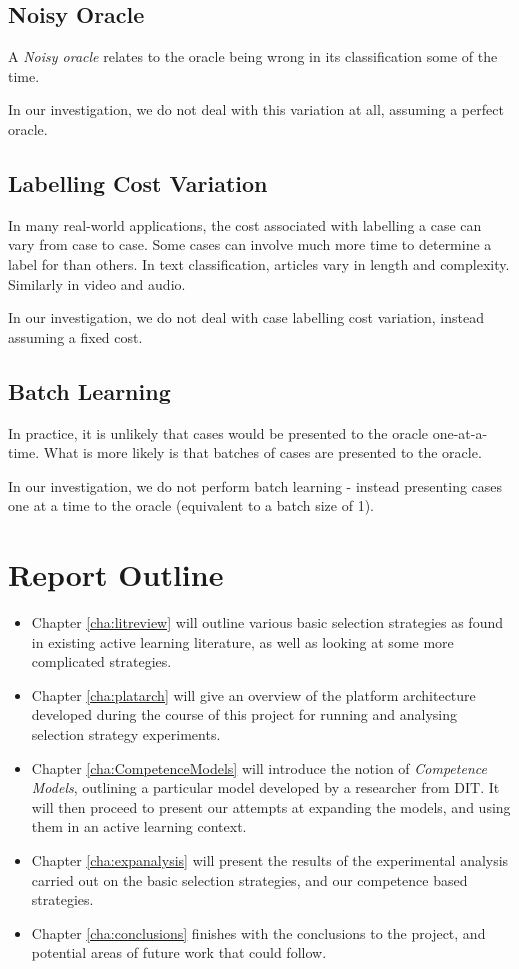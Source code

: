 \documentclass[a4paper,11pt]{report}
\begin{document}
\subsection{Noisy Oracle}
A \emph{Noisy oracle} relates to the oracle being wrong in its classification some of the time.

In our investigation, we do not deal with this variation at all, assuming a perfect oracle.

\subsection{Labelling Cost Variation}
In many real-world applications, the cost associated with labelling a case can vary from case to case. Some cases can involve much more time to determine a label for than others. In text classification, articles vary in length and complexity. Similarly in video and audio.

In our investigation, we do not deal with case labelling cost variation, instead assuming a fixed cost.

\subsection{Batch Learning}
In practice, it is unlikely that cases would be presented to the oracle one-at-a-time. What is more likely is that batches of cases are presented to the oracle.

In our investigation, we do not perform batch learning - instead presenting cases one at a time to the oracle (equivalent to a batch size of 1).

\section{Report Outline}
\begin{itemize}
	\item Chapter \ref{cha:litreview} will outline various basic selection strategies as found in existing active learning literature, as well as looking at some more complicated strategies.
	\item Chapter \ref{cha:platarch} will give an overview of the platform architecture developed during the course of this project for running and analysing selection strategy experiments.
	\item Chapter \ref{cha:CompetenceModels} will introduce the notion of \emph{Competence Models}, outlining a particular model developed by a researcher from DIT. It will then proceed to present our attempts at expanding the models, and using them in an active learning context.
	\item Chapter \ref{cha:expanalysis} will present the results of the experimental analysis carried out on the basic selection strategies, and our competence based strategies.
	\item Chapter \ref{cha:conclusions} finishes with the conclusions to the project, and potential areas of future work that could follow.
\end{itemize}
\end{document}
